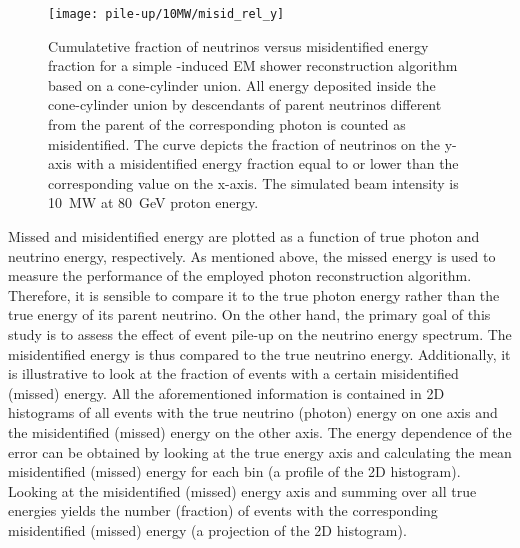 \begin{figure}[htb]
	\centering
	\texttt{[image: pile-up/10MW/misid\_rel\_y]}
	\caption{Cumulatetive fraction of neutrinos versus misidentified energy fraction for a simple \Pgpz-induced EM shower reconstruction algorithm based on a cone-cylinder union.
		All energy deposited inside the cone-cylinder union by descendants of parent neutrinos different from the parent of the corresponding \Pgpz photon is counted as misidentified.
		The curve depicts the fraction of neutrinos on the y-axis with a misidentified energy fraction equal to or lower than the corresponding value on the x-axis.
		The simulated beam intensity is \SI{10}{\mega\watt} at \SI{80}{\giga\electronvolt} proton energy.}
	\label{fig:dune-nd_10MW_misid-rel-y}
\end{figure}

Missed and misidentified energy are plotted as a function of true photon and neutrino energy, respectively.
As mentioned above, the missed energy is used to measure the performance of the employed photon reconstruction algorithm.
Therefore, it is sensible to compare it to the true photon energy rather than the true energy of its parent neutrino.
On the other hand, the primary goal of this study is to assess the effect of event pile-up on the neutrino energy spectrum.
The misidentified energy is thus compared to the true neutrino energy.
Additionally, it is illustrative to look at the fraction of events with a certain misidentified (missed) energy.
All the aforementioned information is contained in 2D histograms of all events with the true neutrino (photon) energy on one axis and the misidentified (missed) energy on the other axis.
The energy dependence of the error can be obtained by looking at the true energy axis and calculating the mean misidentified (missed) energy for each bin (a profile of the 2D histogram).
Looking at the misidentified (missed) energy axis and summing over all true energies yields the number (fraction) of events with the corresponding misidentified (missed) energy (a projection of the 2D histogram).

